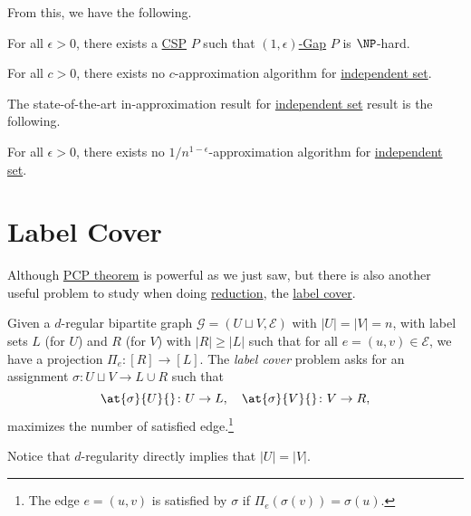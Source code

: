 From this, we have the following.

\begin{theorem}
	For all \(\epsilon > 0\), there exists a \hyperref[prb:CSP]{CSP} \(P\) such that \hyperref[def:c-s-Gap]{\((1, \epsilon )\)-Gap} \(P\) is \(\NP\)-hard.
\end{theorem}
\begin{corollary}
	For all \(c > 0\), there exists no \(c\)-approximation algorithm for \hyperref[prb:independent-set]{independent set}.
\end{corollary}

The state-of-the-art in-approximation result for \hyperref[prb:independent-set]{independent set} result is the following.

\begin{theorem}
	For all \(\epsilon > 0\), there exists no \(1 / n^{1-\epsilon }\)-approximation algorithm for \hyperref[prb:independent-set]{independent set}.
\end{theorem}

\section{Label Cover}
Although \hyperref[thm:PCP]{PCP theorem} is powerful as we just saw, but there is also another useful problem to study when doing \hyperref[def:reduction]{reduction}, the \hyperref[prb:label-cover]{label cover}.

\begin{problem}\label{prb:label-cover}
Given a \(d\)-regular bipartite graph \(\mathcal{G} =(U\sqcup V , \mathcal{E} )\) with \(\vert U \vert = \vert V \vert = n\), with label sets \(L\) (for \(U\)) and \(R\) (for \(V \)) with \(\vert R \vert \geq \vert L \vert \) such that for all \(e=(u, v)\in \mathcal{E} \), we have a projection \(\Pi _e \colon [R]\to [L]\). The \emph{label cover} problem asks for an assignment \(\sigma\colon U \sqcup V \to L \cup R\) such that
\[
	\at{\sigma }{U}{} \colon U \to L,\quad \at{\sigma }{V}{} \colon V \to R,
\]
maximizes the number of satisfied edge.\footnote{The edge \(e=(u, v)\) is satisfied by \(\sigma \) if \(\Pi _e(\sigma (v)) = \sigma (u)\).}
\end{problem}

\begin{note}
	Notice that \(d\)-regularity directly implies that \(\vert U \vert = \vert V \vert\).
\end{note}

\begin{center}
\end{center}

